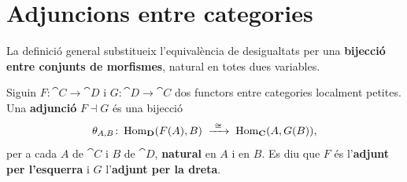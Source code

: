 \section{Adjuncions entre categories}

La definició general substitueix l'equivalència de desigualtats per una \textbf{bijecció entre conjunts de morfismes}, natural en totes dues variables.

\begin{definicio}[Adjunció]
\label{def:adjuncio}
Siguin $F\colon\cat{C}\to\cat{D}$ i $G\colon\cat{D}\to\cat{C}$ dos functors entre categories localment petites. Una \textbf{adjunció} $F\dashv G$ és una bijecció
\[
\theta_{A,B}\colon\Hom_{\cat{D}}(F(A),B)\;\xrightarrow{\ \cong\ }\;\Hom_{\cat{C}}(A,G(B)),
\]
per a cada $A$ de $\cat{C}$ i $B$ de $\cat{D}$, \textbf{natural} en $A$ i en $B$. Es diu que $F$ és l'\textbf{adjunt per l'esquerra} i $G$ l'\textbf{adjunt per la dreta}.
\end{definicio}

